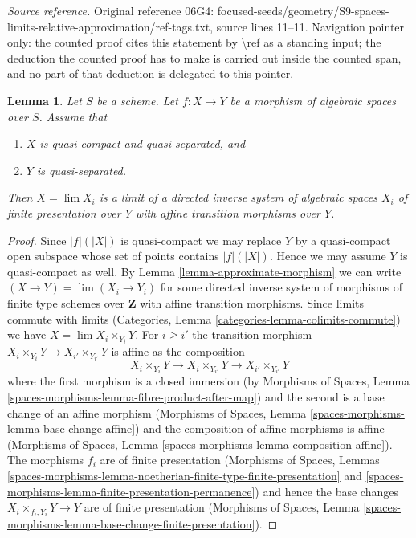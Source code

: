 \documentclass{stacks-project}
\theoremstyle{plain}
\newtheorem{lemma}[subsection]{Lemma}
\theoremstyle{definition}
\theoremstyle{remark}
\numberwithin{equation}{subsection}
\def\lim{\mathop{\mathrm{lim}}\nolimits}
\begin{document}
\noindent\textit{Source reference.} Original reference 06G4: focused-seeds/geometry/S9-spaces-limits-relative-approximation/ref-tags.txt, source lines 11--11. Navigation pointer only: the counted proof cites this statement by \textbackslash{}ref as a standing input; the deduction the counted proof has to make is carried out inside the counted span, and no part of that deduction is delegated to this pointer.\par\medskip
\begin{lemma}
\label{lemma-relative-approximation}
Let $S$ be a scheme. Let $f : X \to Y$ be a morphism of algebraic spaces
over $S$. Assume that
\begin{enumerate}
\item $X$ is quasi-compact and quasi-separated, and
\item $Y$ is quasi-separated.
\end{enumerate}
Then $X = \lim X_i$ is a limit of a directed inverse system of algebraic spaces
$X_i$ of finite presentation over $Y$ with affine transition morphisms
over $Y$.
\end{lemma}

\begin{proof}
Since $|f|(|X|)$ is quasi-compact we may replace $Y$ by a quasi-compact
open subspace whose set of points contains $|f|(|X|)$. Hence we may assume
$Y$ is quasi-compact as well.
By Lemma \ref{lemma-approximate-morphism} we can write
$(X \to Y) = \lim (X_i \to Y_i)$ for some directed inverse system
of morphisms of finite type schemes over $\mathbf{Z}$ with
affine transition morphisms. Since limits commute with limits
(Categories, Lemma \ref{categories-lemma-colimits-commute})
we have $X = \lim X_i \times_{Y_i} Y$. For $i \geq i'$
the transition morphism
$X_i \times_{Y_i} Y \to X_{i'} \times_{Y_{i'}} Y$ is affine as
the composition
$$
X_i \times_{Y_i} Y \to X_i \times_{Y_{i'}} Y \to X_{i'} \times_{Y_{i'}} Y
$$
where the first morphism is a closed immersion (by
Morphisms of Spaces, Lemma
\ref{spaces-morphisms-lemma-fibre-product-after-map})
and the second is a base change of an affine morphism
(Morphisms of Spaces, Lemma \ref{spaces-morphisms-lemma-base-change-affine})
and the composition of affine morphisms is affine
(Morphisms of Spaces, Lemma \ref{spaces-morphisms-lemma-composition-affine}).
The morphisms $f_i$ are of finite presentation
(Morphisms of Spaces, Lemmas
\ref{spaces-morphisms-lemma-noetherian-finite-type-finite-presentation} and
\ref{spaces-morphisms-lemma-finite-presentation-permanence})
and hence the base changes $X_i \times_{f_i, Y_i} Y \to Y$
are of finite presentation
(Morphisms of Spaces, Lemma
\ref{spaces-morphisms-lemma-base-change-finite-presentation}).
\end{proof}
\end{document}
